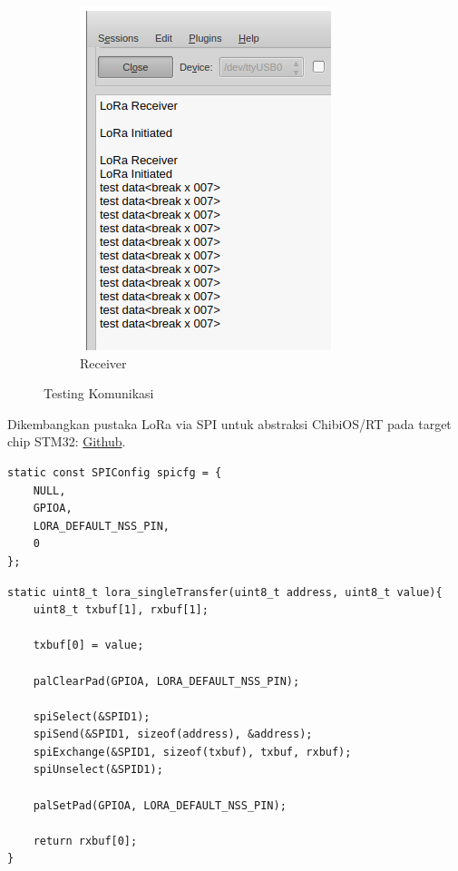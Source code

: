 \documentclass{book} %
\begin{document}
\begin{figure}[!ht]
\begin{subfigure}{0.4\textwidth}
			\includegraphics[width=\textwidth]{images/lorareceiv.png}
			\caption{Receiver}
		\end{subfigure}
		\caption{Testing Komunikasi}
	\end{figure}
	
	Dikembangkan pustaka LoRa via SPI untuk abstraksi ChibiOS/RT pada target chip STM32: \href{https://github.com/mekatronik-achmadi/example_collection/tree/master/embedded/stm32/bluepill_lora/lora}{Github}.
	
	\begin{verbatim}
static const SPIConfig spicfg = {
	NULL,
	GPIOA,
	LORA_DEFAULT_NSS_PIN,
	0
};
	\end{verbatim}
	
	\begin{verbatim}
static uint8_t lora_singleTransfer(uint8_t address, uint8_t value){
	uint8_t txbuf[1], rxbuf[1];
	
	txbuf[0] = value;
	
	palClearPad(GPIOA, LORA_DEFAULT_NSS_PIN);
	
	spiSelect(&SPID1);
	spiSend(&SPID1, sizeof(address), &address);
	spiExchange(&SPID1, sizeof(txbuf), txbuf, rxbuf);
	spiUnselect(&SPID1);
	
	palSetPad(GPIOA, LORA_DEFAULT_NSS_PIN);
	
	return rxbuf[0];
}
	\end{verbatim}
	
\end{document}

